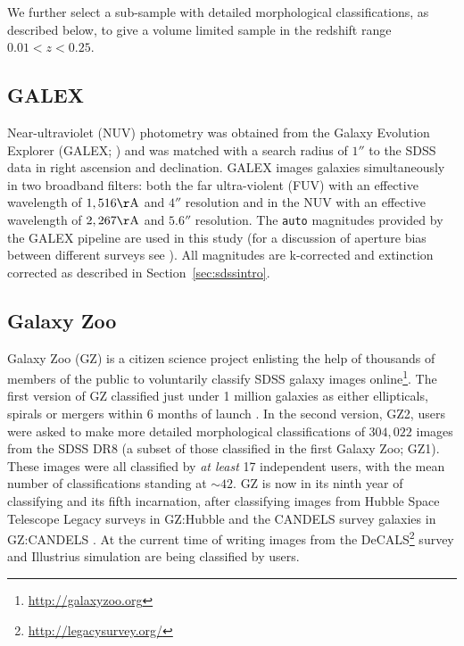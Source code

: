 We further select a sub-sample with detailed morphological classifications, as described below,  to give a volume limited sample in the redshift range $0.01 < z < 0.25$.


\subsection{GALEX}\label{sec:galexintro}

Near-ultraviolet (NUV) photometry was obtained from the Galaxy Evolution Explorer (GALEX; \citealt{Martin05}) and was matched with a search radius of $1''$ to the SDSS data in right ascension and declination. GALEX images galaxies simultaneously in two broadband filters: both the far ultra-violent (FUV) with an effective wavelength of $1,516\rm{\AA}$ and $4''$ resolution and in the NUV with an effective wavelength of $2,267\rm{\AA}$ and $5.6''$ resolution. The {\tt auto} magnitudes provided by the GALEX pipeline are used in this study (for a discussion of aperture bias between different surveys see \citealt{hill11}). All magnitudes are k-corrected and extinction corrected as described in Section~\ref{sec:sdssintro}.

\subsection{Galaxy Zoo}\label{sec:GZ}

Galaxy Zoo (GZ) is a citizen science project enlisting the help of thousands of members of the public to voluntarily classify SDSS galaxy images online\footnote{\url{http://galaxyzoo.org}}. The first version of GZ classified just under 1 million galaxies as either ellipticals, spirals or mergers within 6 months of launch \citep{lintott08, Lintott11}. In the second version, GZ2, users were asked to make more detailed morphological classifications of $304, 022$ images from the SDSS DR8 (a subset of those classified in the first Galaxy Zoo; GZ1). These images were all classified by \emph{at least} 17 independent users, with the mean number of classifications standing at $\sim42$. GZ is now in its ninth year of classifying and its fifth incarnation, after classifying images from Hubble Space Telescope Legacy surveys in GZ:Hubble \citep{willett16} and the CANDELS survey galaxies in GZ:CANDELS \citep{simmons16}. At the current time of writing images from the DeCALS\footnote{\url{http://legacysurvey.org/}} survey and Illustrius simulation \citep{vogelsberger14, genel14} are being classified by users. 

